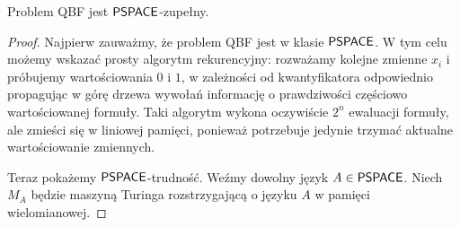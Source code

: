 \begin{theorem}
    Problem QBF jest $\textsf{PSPACE}$-zupełny.
\end{theorem}
\begin{proof}
    Najpierw zauważmy, że problem QBF jest w klasie $\textsf{PSPACE}$.
    W tym celu możemy wskazać prosty algorytm rekurencyjny: rozważamy kolejne zmienne $x_i$ i próbujemy wartościowania $0$ i $1$, w zależności od kwantyfikatora odpowiednio propagując w górę drzewa wywołań informację o prawdziwości częściowo wartościowanej formuły.
    Taki algorytm wykona oczywiście $2^n$ ewaluacji formuły, ale zmieści się w liniowej pamięci, ponieważ potrzebuje jedynie trzymać aktualne wartościowanie zmiennych.

    Teraz pokażemy $\textsf{PSPACE}$-trudność.
    Weźmy dowolny język $A \in \textsf{PSPACE}$.
    Niech $M_A$ będzie maszyną Turinga rozstrzygającą o języku $A$ w pamięci wielomianowej.
\end{proof}
